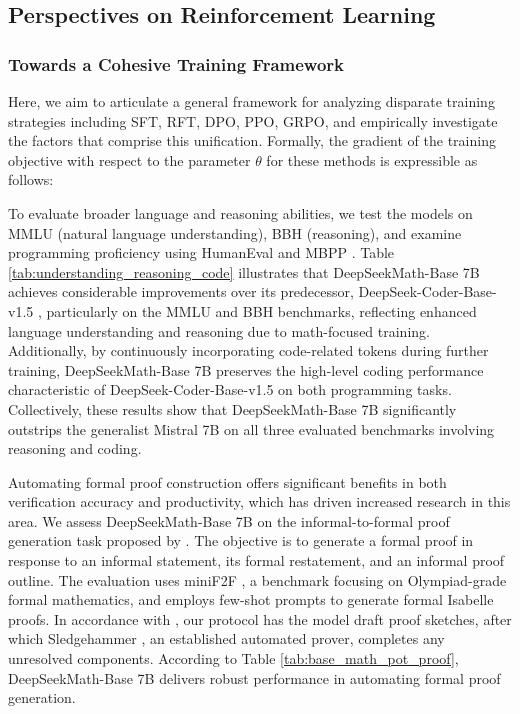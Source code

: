\begin{itemize}[topsep=0pt]
\subsection{Perspectives on Reinforcement Learning}
\subsubsection{Towards a Cohesive Training Framework} Here, we aim to articulate a general framework for analyzing disparate training strategies including SFT, RFT, DPO, PPO, GRPO, and empirically investigate the factors that comprise this unification. Formally, the gradient of the training objective with respect to the parameter $\theta$ for these methods is expressible as follows:

To evaluate broader language and reasoning abilities, we test the models on MMLU \citep{mmlu} (natural language understanding), BBH \citep{bbh} (reasoning), and examine programming proficiency using HumanEval \citep{codex} and MBPP \citep{mbpp}. Table \ref{tab:understanding_reasoning_code} illustrates that DeepSeekMath-Base 7B achieves considerable improvements over its predecessor, DeepSeek-Coder-Base-v1.5 \citep{deepseek-coder}, particularly on the MMLU and BBH benchmarks, reflecting enhanced language understanding and reasoning due to math-focused training. Additionally, by continuously incorporating code-related tokens during further training, DeepSeekMath-Base 7B preserves the high-level coding performance characteristic of DeepSeek-Coder-Base-v1.5 on both programming tasks. Collectively, these results show that DeepSeekMath-Base 7B significantly outstrips the generalist Mistral 7B \citep{mistral} on all three evaluated benchmarks involving reasoning and coding.

Automating formal proof construction offers significant benefits in both verification accuracy and productivity, which has driven increased research in this area. We assess DeepSeekMath-Base 7B on the informal-to-formal proof generation task proposed by \citep{dsp_proof}. The objective is to generate a formal proof in response to an informal statement, its formal restatement, and an informal proof outline. The evaluation uses miniF2F \citep{minif2f}, a benchmark focusing on Olympiad-grade formal mathematics, and employs few-shot prompts to generate formal Isabelle proofs. In accordance with \cite{dsp_proof}, our protocol has the model draft proof sketches, after which Sledgehammer \citep{sledgehammer}, an established automated prover, completes any unresolved components. According to Table \ref{tab:base_math_pot_proof}, DeepSeekMath-Base 7B delivers robust performance in automating formal proof generation.


\end{itemize}
